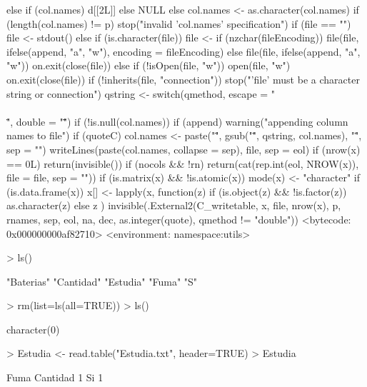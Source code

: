 \documentclass{article}
\begin{document}
\begin{Schunk}
\begin{Soutput}
{{        else if (col.names) 
            d[[2L]]
        else NULL
    }
    else {
        col.names <- as.character(col.names)
        if (length(col.names) != p) 
            stop("invalid 'col.names' specification")
    }
    if (file == "") 
        file <- stdout()
    else if (is.character(file)) {
        file <- if (nzchar(fileEncoding)) 
            file(file, ifelse(append, "a", "w"), encoding = fileEncoding)
        else file(file, ifelse(append, "a", "w"))
        on.exit(close(file))
    }
    else if (!isOpen(file, "w")) {
        open(file, "w")
        on.exit(close(file))
    }
    if (!inherits(file, "connection")) 
        stop("'file' must be a character string or connection")
    qstring <- switch(qmethod, escape = "\\\\\"", double = "\"\"")
    if (!is.null(col.names)) {
        if (append) 
            warning("appending column names to file")
        if (quoteC) 
            col.names <- paste("\"", gsub("\"", qstring, col.names), 
                "\"", sep = "")
        writeLines(paste(col.names, collapse = sep), file, sep = eol)
    }
    if (nrow(x) == 0L) 
        return(invisible())
    if (nocols && !rn) 
        return(cat(rep.int(eol, NROW(x)), file = file, sep = ""))
    if (is.matrix(x) && !is.atomic(x)) 
        mode(x) <- "character"
    if (is.data.frame(x)) {
        x[] <- lapply(x, function(z) {
            if (is.object(z) && !is.factor(z)) 
                as.character(z)
            else z
        })
    }
    invisible(.External2(C_writetable, x, file, nrow(x), p, rnames, 
        sep, eol, na, dec, as.integer(quote), qmethod != "double"))
}
<bytecode: 0x000000000af82710>
<environment: namespace:utils>
\end{Soutput}
\begin{Sinput}
> ls()
\end{Sinput}
\begin{Soutput}
[1] "Baterias" "Cantidad" "Estudia"  "Fuma"     "S"       
\end{Soutput}
\begin{Sinput}
> rm(list=ls(all=TRUE))
> ls()
\end{Sinput}
\begin{Soutput}
character(0)
\end{Soutput}
\begin{Sinput}
> Estudia <- read.table("Estudia.txt", header=TRUE)
> Estudia
\end{Sinput}
\begin{Soutput}
   Fuma Cantidad
1    Si        1

\end{Soutput}
\end{Schunk}
\end{document}
